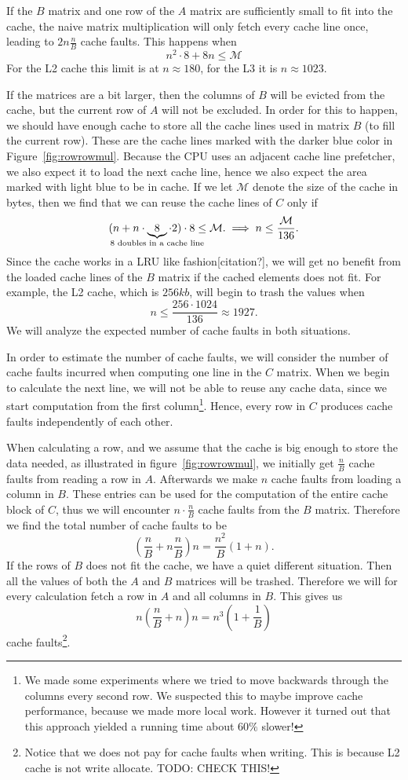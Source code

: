 If the $B$ matrix and one row of the $A$ matrix are sufficiently small
to fit into the cache, the naive matrix multiplication will only fetch
every cache line once, leading to $2n\frac{n}{B}$ cache faults. This
happens when
\[
n^2 \cdot 8 + 8n \leq \mathcal{M}
\]
For the L2 cache this limit is at $n \approx 180$, for the L3 it is $n
\approx 1023$.

If the matrices are a bit larger, then the columns of $B$ will be
evicted from the cache, but the current row of $A$ will not be
excluded. In order for this to happen, we should have enough cache to
store all the cache lines used in matrix $B$ (to fill the current
row). These are the cache lines marked with the darker blue color in
Figure~\ref{fig:rowrowmul}. Because the CPU uses an adjacent cache
line prefetcher, we also expect it to load the next cache line, hence
we also expect the area marked with light blue to be in cache. If we
let $\mathcal{M}$ denote the size of the cache in bytes, then we find
that we can reuse the cache lines of $C$ only if
\[
( n + n \cdot \underbrace{8}_{\mathclap{8 \text{ doubles in a cache line}}} \cdot 2) \cdot 8 \leq \mathcal{M}.
\implies
n \leq \frac{\mathcal{M}}{136}.
\]
Since the cache works in a LRU like fashion[citation?], we will get no
benefit from the loaded cache lines of the $B$ matrix if the cached
elements does not fit. For example, the L2 cache, which is $256kb$,
will begin to trash the values when
\[
n \leq \frac{256 \cdot 1024}{136} \approx 1927.
\]
We will analyze the expected number of cache faults in both situations.

In order to estimate the number of cache faults, we will consider the
number of cache faults incurred when computing one line in the $C$
matrix. When we begin to calculate the next line, we will not be able
to reuse any cache data, since we start computation from the first
column\footnote{We made some experiments where we tried to move
  backwards through the columns every second row. We suspected this to
  maybe improve cache performance, because we made more local
  work. However it turned out that this approach yielded a running
  time about $60\%$ slower!}. Hence, every row in $C$ produces cache
faults independently of each other.

When calculating a row, and we assume that the cache is big enough to
store the data needed, as illustrated in figure~\ref{fig:rowrowmul},
we initially get $\frac{n}{B}$ cache faults from reading a row in $A$.
Afterwards we make $n$ cache faults from loading a column in
$B$. These entries can be used for the computation of the entire cache
block of $C$, thus we will encounter $n \cdot \frac{n}{B}$ cache
faults from the $B$ matrix. Therefore we find the total number of
cache faults to be
\[
\left( \frac{n}{B} + n \frac{n}{B} \right) n = \frac{n^2}{B} \left( 1 + n \right).
\]
If the rows of $B$ does not fit the cache, we have a quiet different
situation. Then all the values of both the $A$ and $B$ matrices will
be trashed. Therefore we will for every calculation fetch a row in $A$
and all columns in $B$. This gives us
\[
n\left( \frac{n}{B} + n \right) n = n^3 \left(1 + \frac{1}{B} \right)
\]
cache faults\footnote{Notice that we does not pay for cache faults
  when writing. This is because L2 cache is not write
  allocate. TODO: CHECK THIS!}.

